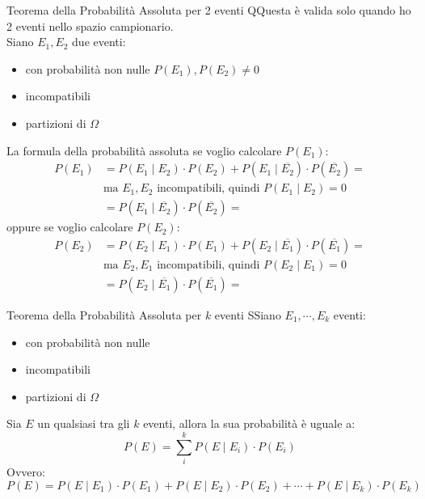 \documentclass{article}  %
\theoremstyle{definition}
\begin{document}
\begin{theorem}{Teorema della Probabilità Assoluta per 2 eventi}
	QQuesta è valida solo quando ho 2 eventi nello spazio campionario. \\
	Siano $E_1, E_2$ due eventi:
	\begin{itemize}
		\item con probabilità non nulle $P(E_1),P(E_2) \neq 0$
		\item incompatibili
		\item partizioni di $\Omega$
	\end{itemize}
	La formula della probabilità assoluta se voglio calcolare $P(E_1)$:
	\begin{align*}
		P(E_1)
		 & = P(E_1 \mid E_2) \cdot P(E_2)+P(E_1 \mid \overline{E_2})\cdot P(\overline{E_2}) = \\
		 & \text{ma $E_1,E_2$ incompatibili, quindi $P(E_1 \mid E_2)=0$}                      \\
		 & = P(E_1 \mid \overline{E_2})\cdot P(\overline{E_2}) =
	\end{align*}
	oppure se voglio calcolare $P(E_2)$:
	\begin{align*}
		P(E_2)
		 & = P(E_2 \mid E_1) \cdot P(E_1)+P(E_2 \mid \overline{E_1})\cdot P(\overline{E_1}) = \\
		 & \text{ma $E_2,E_1$ incompatibili, quindi $P(E_2 \mid E_1)=0$}                      \\
		 & = P(E_2 \mid \overline{E_1})\cdot P(\overline{E_1}) =
	\end{align*}
\end{theorem}
\begin{theorem}{Teorema della Probabilità Assoluta per $k$ eventi}
	SSiano $E_1,\cdots, E_k$ eventi:
	\begin{itemize}
		\item con probabilità non nulle
		\item incompatibili
		\item partizioni di $\Omega$
	\end{itemize}
	Sia $E$ un qualsiasi tra gli $k$ eventi, allora la sua probabilità è uguale a:
	\[
		P(E) = \sum_{i}^{k} P(E \mid E_i) \cdot P(E_i)
	\]
	Ovvero:
	\[
		P(E) = P(E \mid E_1) \cdot P(E_1) + P(E \mid E_2) \cdot P(E_2) + \cdots + P(E \mid E_k) \cdot P(E_k)
	\]
\end{theorem}
\end{document}
